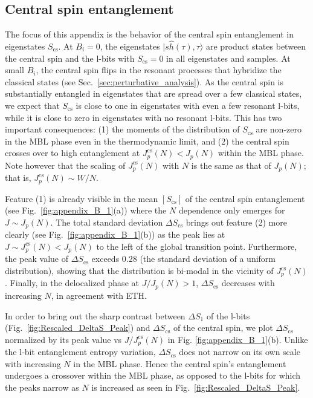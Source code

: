 \documentclass[aps,pra,twocolumn,a4paper,showpacs,superscriptaddress,floatfix,10pt]{revtex4}
\begin{document}
\begin{widetext}
\section{Central spin entanglement}
\label{app:central_spin_entanglement}

The focus of this appendix is the behavior of the central spin entanglement in eigenstates $S_{\mathrm{cs}}$.
At $B_i=0$, the eigenstates $|s\hat{h}(\tau), \tau\rangle$ are product states between the central spin and the l-bits with $S_{\mathrm{cs}}=0$ in all eigenstates and samples.
At small $B_i$, the central spin flips in the resonant processes that hybridize the classical states (see Sec.~\ref{sec:perturbative_analysis}).
As the central spin is substantially entangled in eigenstates that are spread over a few classical states, we expect that $S_{\mathrm{cs}}$ is close to one in eigenstates with even a few resonant l-bits, while it is close to zero in eigenstates with no resonant l-bits.
%
This has two important consequences:
(1) the moments of the distribution of $S_{\mathrm{cs}}$ are non-zero in the MBL phase even in the thermodynamic limit, and
(2) the central spin crosses over to high entanglement at $J^{\mathrm{cs}}_p(N) < J_p(N)$ within the MBL phase.
Note however that the scaling of $J^{\mathrm{cs}}_p(N)$ with $N$ is the same as that of $J_p(N)$; that is, $J^{\mathrm{cs}}_p(N) \sim W/N$.

Feature (1) is already visible in the mean $[S_{\mathrm{cs}}]$ of the central spin entanglement (see Fig.~\ref{fig:appendix_B_1}(a)) where the $N$ dependence only emerges for $J \sim J_p(N)$.
The total standard deviation $\Delta S_{\mathrm{cs}}$ brings out feature (2) more clearly (see Fig.~\ref{fig:appendix_B_1}(b)) as the peak lies at $J \sim J^{\mathrm{cs}}_p(N) < J_p(N)$ to the left of the global transition point.
%
Furthermore, the peak value of $\Delta S_{\mathrm{cs}}$ exceeds $0.28$ (the standard deviation of a uniform distribution), showing that the distribution is bi-modal in the vicinity of $J^{\mathrm{cs}}_p(N)$.
Finally, in the delocalized phase at $J/J_p(N)>1$, $\Delta S_{\mathrm{cs}}$ decreases with increasing $N$, in agreement with ETH.

In order to bring out the sharp contrast between $\Delta S_1$ of the l-bits (Fig.~\ref{fig:Rescaled_DeltaS_Peak}) and  $\Delta S_{\mathrm{cs}}$ of the central spin, we plot $\Delta S_{\mathrm{cs}}$ normalized by its peak value vs $J/J^{\mathrm{cs}}_{p}(N)$ in Fig. \ref{fig:appendix_B_1}(b).
Unlike the l-bit entanglement entropy variation, $\Delta S_{\mathrm{cs}}$ does not narrow on its own scale with increasing $N$ in the MBL phase.
Hence the central spin's entanglement undergoes a crossover within the MBL phase, as opposed to the l-bits for which the peaks narrow as $N$ is increased as seen in Fig.~\ref{fig:Rescaled_DeltaS_Peak}.



\end{widetext}
\end{document}
